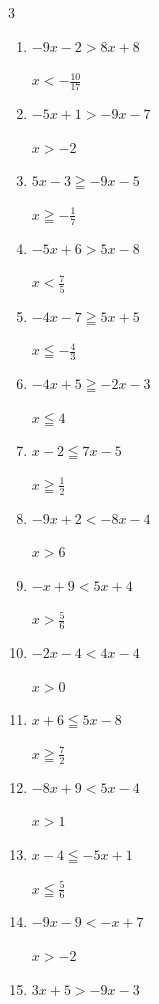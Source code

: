 \begin{multicols}{3}
\begin{enumerate}
  \item $-9x-2>8x+8$

        $\displaystyle x<-\frac{10}{17}$

  \item $-5x+1>-9x-7$

        $\displaystyle x>-2$

  \item $5x-3\geqq -9x-5$

        $\displaystyle x\geqq -\frac{1}{7}$

  \item $-5x+6>5x-8$

        $\displaystyle x<\frac{7}{5}$

  \item $-4x-7\geqq 5x+5$

        $\displaystyle x\leqq -\frac{4}{3}$

  \item $-4x+5\geqq -2x-3$

        $\displaystyle x\leqq 4$

  \item $x-2\leqq 7x-5$

        $\displaystyle x\geqq \frac{1}{2}$

  \item $-9x+2<-8x-4$

        $\displaystyle x>6$

  \item $-x+9<5x+4$

        $\displaystyle x>\frac{5}{6}$

  \item $-2x-4<4x-4$

        $\displaystyle x>0$

\columnbreak %

  \item $x+6\leqq 5x-8$

        $\displaystyle x\geqq \frac{7}{2}$

  \item $-8x+9<5x-4$

        $\displaystyle x>1$

  \item $x-4\leqq -5x+1$

        $\displaystyle x\leqq \frac{5}{6}$

  \item $-9x-9<-x+7$

        $\displaystyle x>-2$

  \item $3x+5>-9x-3$


\end{enumerate}
\end{multicols}

